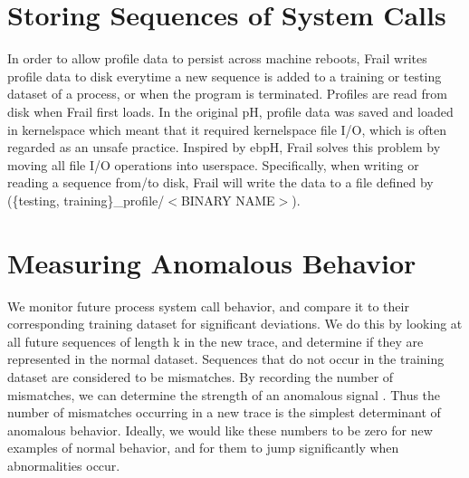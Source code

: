 \documentclass{report}
\begin{document}
\begin{spacing}{1.5}
\section{Storing Sequences of System Calls}


{\large
In order to allow profile data to persist across machine reboots, Frail writes profile data to disk everytime a new sequence is added to a training or testing dataset of a process, or when the program is terminated. Profiles are read from disk when Frail first loads. In the original pH, profile data was saved and loaded in kernelspace \cite{somayaji2002operating} which meant that it required kernelspace file I/O, which is often regarded as an unsafe practice. Inspired by ebpH, Frail solves this problem by moving all file I/O operations into userspace. Specifically, when writing or reading a sequence from/to disk, Frail will write the data to a file defined by (\{testing, training\}\_profile/$<$BINARY NAME$>$).
\newline
}



\section{Measuring Anomalous Behavior}


{\large
We monitor future process system call behavior, and compare it to their corresponding training dataset for significant deviations. We do this by looking at all future sequences of length k in the new trace, and determine if they are represented in the normal dataset. Sequences that do not occur in the training dataset are considered to be mismatches. By recording the number of mismatches, we can determine the strength of an anomalous signal \cite{hofmeyr1998intrusion}. Thus the number of mismatches occurring in a new trace is the simplest determinant of anomalous behavior. Ideally, we would like these numbers to be zero for new examples of normal behavior, and for them to jump significantly when abnormalities occur.
\newline
}


\end{spacing}
\end{document}
